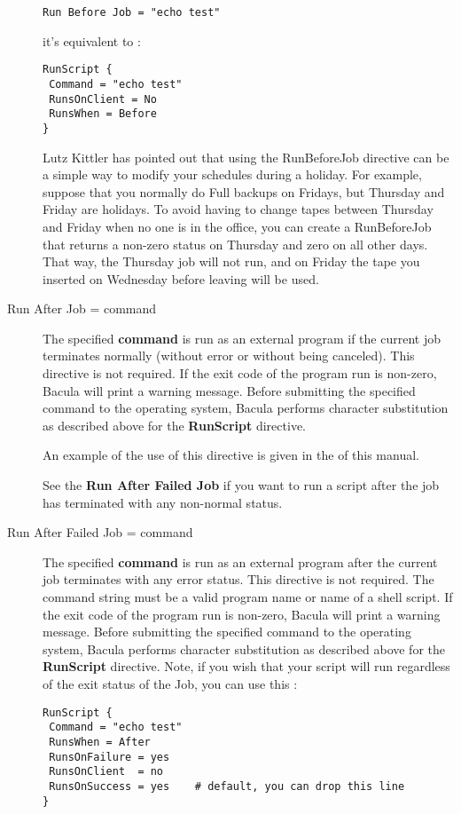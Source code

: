 \begin{description}
\begin{verbatim}
Run Before Job = "echo test"
\end{verbatim}
   it's equivalent to :
\begin{verbatim}
RunScript {
 Command = "echo test"
 RunsOnClient = No
 RunsWhen = Before
}
\end{verbatim} 

   Lutz Kittler has pointed out that using the RunBeforeJob directive can be a
   simple way to modify your schedules during a holiday.  For example, suppose
   that you normally do Full backups on Fridays, but Thursday and Friday are
   holidays.  To avoid having to change tapes between Thursday and Friday when
   no one is in the office, you can create a RunBeforeJob that returns a
   non-zero status on Thursday and zero on all other days.  That way, the
   Thursday job will not run, and on Friday the tape you inserted on Wednesday
   before leaving will be used.

\item [Run After Job = \lt{}command\gt{}]
   The specified {\bf command} is run as an external program if the current
   job terminates normally (without error or without being canceled).  This
   directive is not required.  If the exit code of the program run is
   non-zero, Bacula will print a warning message.  Before submitting the
   specified command to the operating system, Bacula performs character
   substitution as described above for the {\bf RunScript} directive.
   
   An example of the use of this directive is given in the  
    of this manual.  

   See the {\bf Run After Failed Job} if you
   want to run a script after the job has terminated with any
   non-normal status.

\item [Run After Failed Job = \lt{}command\gt{}]
   The specified {\bf command} is run as an external program after the current
   job terminates with any error status.  This directive is not required.  The
   command string must be a valid program name or name of a shell script. If
   the exit code of the program run is non-zero, Bacula will print a
   warning message. Before submitting the specified command to the
   operating system, Bacula performs character substitution as described above
   for the {\bf RunScript} directive. Note, if you wish that your script
   will run regardless of the exit status of the Job, you can use this :
\begin{verbatim}
RunScript {
 Command = "echo test"
 RunsWhen = After
 RunsOnFailure = yes
 RunsOnClient  = no
 RunsOnSuccess = yes    # default, you can drop this line
}
\end{verbatim}


\end{description}
